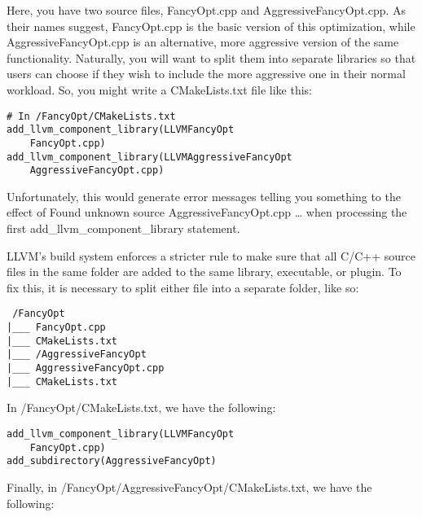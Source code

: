 Here, you have two source files, FancyOpt.cpp and AggressiveFancyOpt.cpp. As their names suggest, FancyOpt.cpp is the basic version of this optimization, while AggressiveFancyOpt.cpp is an alternative, more aggressive version of the same functionality. Naturally, you will want to split them into separate libraries so that users can choose if they wish to include the more aggressive one in their normal workload. So, you might write a CMakeLists.txt file like this:

\begin{lstlisting}[style=styleCMake]
# In /FancyOpt/CMakeLists.txt
add_llvm_component_library(LLVMFancyOpt
	FancyOpt.cpp)
add_llvm_component_library(LLVMAggressiveFancyOpt
	AggressiveFancyOpt.cpp)
\end{lstlisting}

Unfortunately, this would generate error messages telling you something to the effect of Found unknown source AggressiveFancyOpt.cpp … when processing the first add\_llvm\_component\_library statement.

LLVM's build system enforces a stricter rule to make sure that all C/C++ source files in the same folder are added to the same library, executable, or plugin. To fix this, it is necessary to split either file into a separate folder, like so:

\begin{tcolorbox}[colback=white,colframe=black]
\tt
/FancyOpt \\
\hspace*{0.5cm}|\_\_\_ FancyOpt.cpp \\
\hspace*{0.5cm}|\_\_\_ CMakeLists.txt \\
\hspace*{0.5cm}|\_\_\_ /AggressiveFancyOpt \\
\hspace*{1cm}|\_\_\_ AggressiveFancyOpt.cpp \\
\hspace*{1cm}|\_\_\_ CMakeLists.txt
\end{tcolorbox}

In /FancyOpt/CMakeLists.txt, we have the following:

\begin{lstlisting}[style=styleCMake]
add_llvm_component_library(LLVMFancyOpt
	FancyOpt.cpp)
add_subdirectory(AggressiveFancyOpt)
\end{lstlisting}

Finally, in /FancyOpt/AggressiveFancyOpt/CMakeLists.txt, we have the following:

